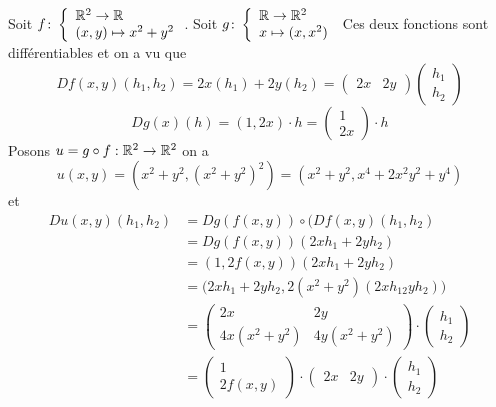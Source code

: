 \begin{exemple}
    Soit $f\colon \left\{\begin{array}{l}\mathbb{R}^2\to \mathbb{R} \\(x,y)\mapsto x^2+ y^2\end{array}\right.$.
    Soit $g\colon \left\{\begin{array}{l}\mathbb{R}\to\mathbb{R}^2 \\x\mapsto (x,x^2)\end{array}\right.$
    Ces deux fonctions sont différentiables et on a vu que 
    \begin{equation*}
        Df(x,y)(h_1,h_2)=2x(h_1)+2y(h_2)=\begin{pmatrix}
            2x &2y
        \end{pmatrix}
        \begin{pmatrix}
            h_1\\h_2
        \end{pmatrix}
    \end{equation*}
    \begin{equation*}
        Dg(x)(h) = (1, 2x)\cdot h = \begin{pmatrix}
            1\\ 2x
        \end{pmatrix}\cdot h
    \end{equation*}
    Posons $u=g\circ f:\mathbb{R}^2\to\mathbb{R}^2$ on a
    \begin{equation*}
        u(x,y)=(x^2+y^2,(x^2+ y^2)^2)=(x^2+y^2, x^4+2x^2y^2+y^4)
    \end{equation*}
    et 
    \begin{align*}
        Du(x,y)(h_1,h_2)&= Dg(f(x,y))\circ (Df(x,y)(h_1,h_2)\\
        &=Dg(f(x,y))(2xh_1+2yh_2)\\
        &=(1,2f(x,y))(2xh_1+2yh_2)\\
        &= \big(2xh_1+2yh_2,2(x^2+y^2)(2xh_12yh_2)\big)\\
        &= \begin{pmatrix}
            2x & 2y\\
            4x(x^2+y^2) & 4y(x^2+y^2)
        \end{pmatrix}\cdot
        \begin{pmatrix}
            h_1\\
            h_2
        \end{pmatrix}\\
        &=\begin{pmatrix}
            1\\
            2f(x,y)
        \end{pmatrix}\cdot
        \begin{pmatrix}
            2x & 2y
        \end{pmatrix}\cdot
        \begin{pmatrix}
            h_1\\
            h_2
        \end{pmatrix}
    \end{align*}
\end{exemple}
